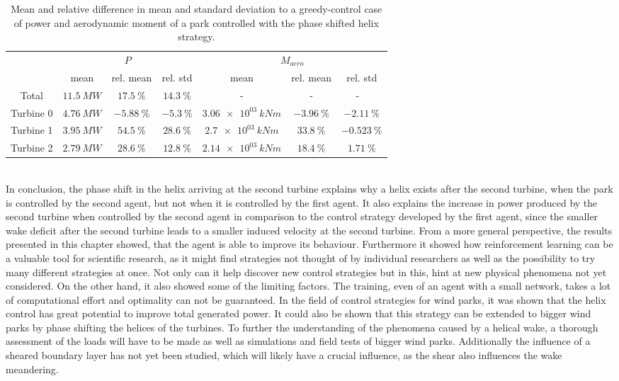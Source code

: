 \begin{table}[h]
	\centering
	\caption{Mean and relative difference in mean and standard deviation to a greedy-control case of power and aerodynamic moment of a park controlled with the phase shifted helix strategy.}
	\begin{tabular}{ccccccc}
		\toprule
		& \multicolumn{3}{c}{$P$}  & \multicolumn{3}{c}{$M_{aero}$ }\\ \cmidrule(rl){2-4} \cmidrule(rl){5-7}
		& mean & rel. mean & rel. std  & mean & rel. mean & rel. std \\ \midrule
		Total & $\SI{  11.5}{MW} $ & $\SI{ +17.5}{\%}$ & $\SI{ +14.3}{\%}$ &-&-&- \
		\\
		Turbine 0  & $\SI{  4.76}{MW} $ & $\SI{ -5.88}{\%}$ & $\SI{  -5.3}{\%}$ & $\SI{3.06e03}{kNm} $ & $\SI{ -3.96}{\%}$ & $\SI{ -2.11}{\%}$ \\
		Turbine 1  & $\SI{  3.95}{MW} $ & $\SI{ +54.5}{\%}$ & $\SI{ +28.6}{\%}$ & $\SI{2.7e03}{kNm} $ & $\SI{ +33.8}{\%}$ & $\SI{-0.523}{\%}$ \\
		Turbine 2  & $\SI{  2.79}{MW} $ & $\SI{ +28.6}{\%}$ & $\SI{ +12.8}{\%}$ & $\SI{2.14e03}{kNm} $ & $\SI{ +18.4}{\%}$ & $\SI{ +1.71}{\%}$ \\
		\bottomrule
	\end{tabular}
	\label{tab:optimal_greedy}
\end{table} \\
In conclusion, the phase shift in the helix arriving at the second turbine explains why a helix exists after the second turbine, when the park is controlled by the second agent, but not when it is controlled by the first agent. It also explains the increase in power produced by the second turbine when controlled by the second agent in comparison to the control strategy developed by the first agent, since the smaller wake deficit after the second turbine leads to a smaller induced velocity at the second turbine. From a more general perspective, the results presented in this chapter showed, that the agent is able to improve its behaviour. Furthermore it showed how reinforcement learning can be a valuable tool for scientific research, as it might find strategies not thought of by individual researchers as well as the possibility to try many different strategies at once. Not only can it help discover new control strategies but in this, hint at new physical phenomena not yet considered. On the other hand, it also showed some of the limiting factors. The training, even of an agent with a small network, takes a lot of computational effort and optimality can not be guaranteed. In the field of control strategies for wind parks, it was shown that the helix control has great potential to improve total generated power. It could also be shown that this strategy can be extended to bigger wind parks by phase shifting the helices of the turbines. To further the understanding of the phenomena caused by a helical wake, a thorough assessment of the loads will have to be made as well as simulations and field tests of bigger wind parks. Additionally the influence of a sheared boundary layer has not yet been studied, which will likely have a crucial influence, as the shear also influences the wake meandering.